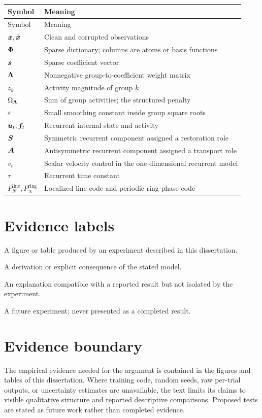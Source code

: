 \begin{longtable}{@{}p{}p{}@{}}
\toprule
Symbol & Meaning \\
\midrule
\endfirsthead
\toprule
Symbol & Meaning \\
\midrule
\endhead
$\bm{x},\tilde{\bm{x}}$ & Clean and corrupted observations \\
$\bm{\Phi}$ & Sparse dictionary; columns are atoms or basis functions \\
$\bm{s}$ & Sparse coefficient vector \\
$\bm{\Lambda}$ & Nonnegative group-to-coefficient weight matrix \\
$z_k$ & Activity magnitude of group $k$ \\
$\Omega_{\bm{\Lambda}}$ & Sum of group activities; the structured penalty \\
$\varepsilon$ & Small smoothing constant inside group square roots \\
$\bm{u}_t,\bm{f}_t$ & Recurrent internal state and activity \\
$\bm{S}$ & Symmetric recurrent component assigned a restoration role \\
$\bm{A}$ & Antisymmetric recurrent component assigned a transport role \\
$v_t$ & Scalar velocity control in the one-dimensional recurrent model \\
$\tau$ & Recurrent time constant \\
$P_N^{\mathrm{line}},P_N^{\mathrm{ring}}$ & Localized line code and periodic ring-phase code \\
\bottomrule
\end{longtable}

\section{Evidence labels}

\begin{description}[style=nextline]
  \item[Reported evidence] A figure or table produced by an experiment described in this dissertation.
  \item[Mathematical clarification] A derivation or explicit consequence of the stated model.
  \item[Interpretation] An explanation compatible with a reported result but not isolated by the experiment.
  \item[Proposed test] A future experiment; never presented as a completed result.
\end{description}

\section{Evidence boundary}

The empirical evidence needed for the argument is contained in the figures and tables of this dissertation. Where training code, random seeds, raw per-trial outputs, or uncertainty estimates are unavailable, the text limits its claims to visible qualitative structure and reported descriptive comparisons. Proposed tests are stated as future work rather than completed evidence.
